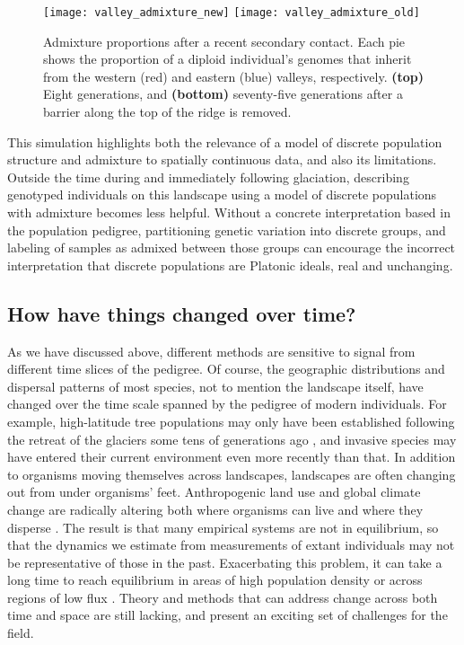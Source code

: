 \documentclass{ar-1col}
\begin{document}
{\begin{figure}	%
    \centering
        \texttt{[image: valley\_admixture\_new]}
        \texttt{[image: valley\_admixture\_old]}
        \caption{
            Admixture proportions after a recent secondary contact.
            Each pie shows the proportion of a diploid individual's genomes
            that inherit from the western (red) and eastern (blue) valleys, respectively.
            \textbf{(top)} Eight generations, and
            \textbf{(bottom)} seventy-five generations 
            after a barrier along the top of the ridge is removed.
        }
        \label{postglacial_expansion}
\end{figure}

This simulation highlights both the relevance of 
a model of discrete population structure and admixture
to spatially continuous data, 
and also its limitations.
Outside the time during and immediately following glaciation, 
describing genotyped individuals on this landscape 
using a model of discrete populations with admixture 
becomes less helpful.
Without a concrete interpretation based in the population pedigree,
partitioning genetic variation into discrete groups, 
and labeling of samples as admixed between those groups
can encourage the incorrect interpretation that discrete populations are Platonic ideals,
real and unchanging.

\subsection{How have things changed over time?}

As we have discussed above,
different methods are sensitive to signal
from different time slices of the pedigree.
Of course, the geographic distributions and dispersal patterns of most species,
not to mention the landscape itself,
have changed over the time scale spanned by the pedigree of modern individuals.
For example, 
high-latitude tree populations may only have been established
following the retreat of the glaciers
some tens of generations ago \citep{WhitlockMcCauley1999},
and invasive species may have entered their current
environment even more recently than that.
In addition to organisms moving themselves across landscapes,
landscapes are often changing out from under organisms' feet.
Anthropogenic land use
and global climate change
are radically altering both where organisms can live
and where they disperse \citep{parmesan1999}.
The result is that many empirical systems
are not in equilibrium,
so that the dynamics we estimate from
measurements of extant individuals may
not be representative of those in the past.
Exacerbating this problem,
it can take a long time to reach equilibrium
in areas of high population density
or across regions of low flux
\citep{CrowAoki1984group, whitlock1992temporal, slatkin1993isolation, WhitlockMcCauley1999}.
Theory and methods that can address change across both time and space
are still lacking,
and present an exciting set of challenges for the field.

}
\end{document}

